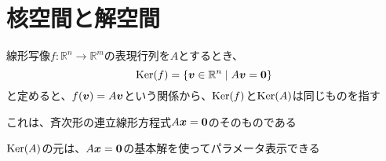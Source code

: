 \documentclass[../../../topic_linear-algebra]{subfiles}
\begin{document}
\sectionline
\section{核空間と解空間}

線形写像$f\colon \mathbb{R}^n \to \mathbb{R}^m$の表現行列を$A$とするとき、
\begin{equation*}
  \operatorname{Ker}(f) = \{ \vb*{v} \in \mathbb{R}^n \mid A\vb*{v} = \vb*{0} \}
\end{equation*}
と定めると、$f(\vb*{v}) = A\vb*{v}$という関係から、$\operatorname{Ker}(f)$と$\operatorname{Ker}(A)$は同じものを指す

\br

これは、斉次形の連立線形方程式$A\vb*{x} = \vb*{0}$のそのものである

$\operatorname{Ker}(A)$の元は、$A\vb*{x} = \vb*{0}$の基本解を使ってパラメータ表示できる
\end{document}
